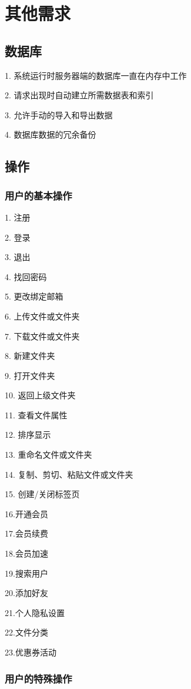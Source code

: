 \chapter{其他需求}

\section{数据库}
    
    1. 系统运行时服务器端的数据库一直在内存中工作

    2. 请求出现时自动建立所需数据表和索引

    3. 允许手动的导入和导出数据

    4. 数据库数据的冗余备份
\section{操作}
\subsection{用户的基本操作}

    1. 注册

    2. 登录

    3. 退出

    4. 找回密码

    5. 更改绑定邮箱

    6. 上传文件或文件夹

    7. 下载文件或文件夹

    8. 新建文件夹

    9. 打开文件夹

    10. 返回上级文件夹

    11. 查看文件属性

    12. 排序显示

    13. 重命名文件或文件夹

    14. 复制、剪切、粘贴文件或文件夹

    15. 创建/关闭标签页
    
{
    \color{red}
    16.开通会员

    17.会员续费

    18.会员加速

    19.搜索用户

    20.添加好友

    21.个人隐私设置

    22.文件分类

    23.优惠券活动
}
\subsection{用户的特殊操作}

